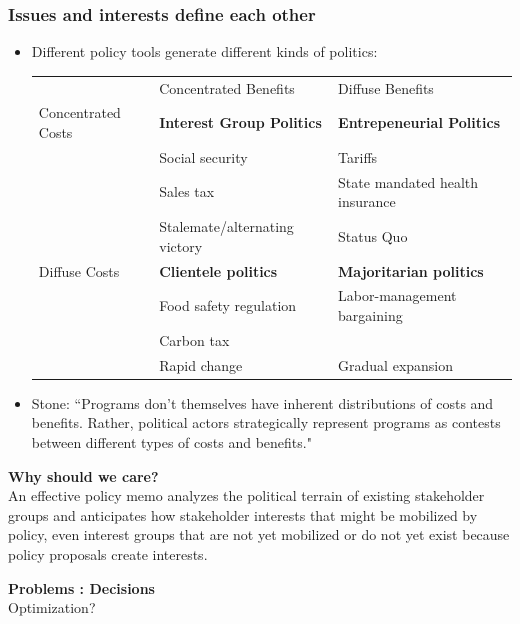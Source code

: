 \documentclass[aspectratio=169]{beamer}
\theoremstyle{principle}
\begin{document}
\begin{frame}
\frametitle{Issues and interests define each other}
\begin{itemize}
\item Different policy tools generate different kinds of politics:
\begin{table}[]
\begin{tabular}{lll}
&Concentrated Benefits&Diffuse Benefits\\
Concentrated Costs&\textbf{Interest Group Politics}&\textbf{Entrepeneurial Politics}\\
&Social security&Tariffs\\
&Sales tax&State mandated health insurance\\
&Stalemate/alternating victory&Status Quo\\
Diffuse Costs&\textbf{Clientele politics} & \textbf{Majoritarian politics}\\
&Food safety regulation&Labor-management bargaining\\
&Carbon tax&\\
&Rapid change&Gradual expansion
\end{tabular}
\end{table}
\bigskip
\bigskip
\item Stone: ``Programs don’t themselves have inherent distributions of costs and benefits. Rather, political actors strategically represent programs as contests between different types of costs and benefits."
\end{itemize}
\end{frame}

\begin{frame}

\begin{center}
\Huge\textbf{Why should we care?}\\
\bigskip
\bigskip
\large An effective policy memo analyzes the political terrain of existing stakeholder groups and anticipates how stakeholder interests that might be mobilized by policy, even interest groups that are not yet mobilized or do not yet exist because policy proposals create interests.
\\
\end{center}

\end{frame}

\begin{frame}

\begin{center}
\Huge\textbf{Problems : Decisions}\\
\bigskip
\bigskip
\large Optimization?
\end{center}

\end{frame}
\end{document}
